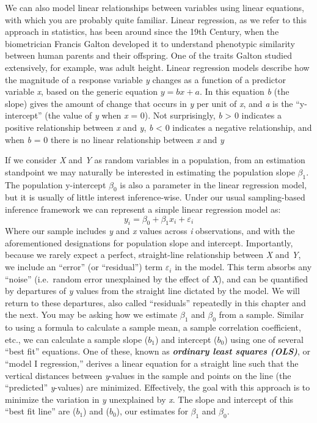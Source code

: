 \documentclass[]{book}
\begin{document}
We can also model linear relationships between variables using linear equations, with which you are probably quite familiar. Linear regression, as we refer to this approach in statistics, has been around since the 19th Century, when the biometrician Francis Galton developed it to understand phenotypic similarity between human parents and their offspring. One of the traits Galton studied extensively, for example, was adult height. Linear regression models describe how the magnitude of a response variable \emph{y} changes as a function of a predictor variable \emph{x}, based on the generic equation \(y=bx+a\). In this equation \emph{b} (the slope) gives the amount of change that occurs in \emph{y} per unit of \emph{x}, and \emph{a} is the ``y-intercept'' (the value of \emph{y} when \emph{x} = 0). Not surprisingly, \emph{b} \textgreater{} 0 indicates a positive relationship between \emph{x} and \emph{y}, \emph{b} \textless{} 0 indicates a negative relationship, and when \emph{b} = 0 there is no linear relationship between \emph{x} and \emph{y}

If we consider \emph{X} and \emph{Y} as random variables in a population, from an estimation standpoint we may naturally be interested in estimating the population slope \(\beta_1\). The population y-intercept \(\beta_0\) is also a parameter in the linear regression model, but it is usually of little interest inference-wise. Under our usual sampling-based inference framework we can represent a simple linear regression model as:
\[y_i=\beta_0+\beta_1x_i+\varepsilon_i\]
Where our sample includes \emph{y} and \emph{x} values across \emph{i} observations, and with the aforementioned designations for population slope and intercept. Importantly, because we rarely expect a perfect, straight-line relationship between \emph{X} and \emph{Y}, we include an ``error'' (or ``residual'') term \(\varepsilon_i\) in the model. This term absorbs any ``noise'' (i.e.~random error unexplained by the effect of \emph{X}), and can be quantified by departures of \emph{y} values from the straight line dictated by the model. We will return to these departures, also called ``residuals'' repeatedly in this chapter and the next. You may be asking how we estimate \(\beta_1\) and \(\beta_0\) from a sample. Similar to using a formula to calculate a sample mean, a sample correlation coefficient, etc., we can calculate a sample slope (\(b_1\)) and intercept (\(b_0\)) using one of several ``best fit'' equations. One of these, known as \textbf{\emph{ordinary least squares (OLS)}}, or ``model I regression,'' derives a linear equation for a straight line such that the vertical distances between \emph{y}-values in the sample and points on the line (the ``predicted'' \emph{y}-values) are minimized. Effectively, the goal with this approach is to minimize the variation in \emph{y} unexplained by \emph{x}. The slope and intercept of this ``best fit line'' are (\(b_1\)) and (\(b_0\)), our estimates for \(\beta_1\) and \(\beta_0\).
\end{document}
